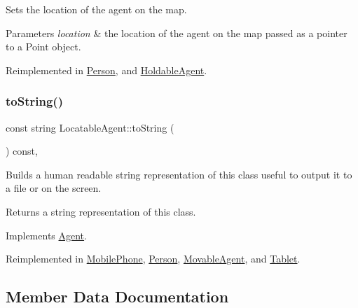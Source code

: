 Sets the location of the agent on the map. 
\begin{DoxyParams}{Parameters}
{\em location} & the location of the agent on the map passed as a pointer to a Point object. \\
\hline
\end{DoxyParams}


Reimplemented in \hyperlink{class_person_a05f4ac2107d59e03f0f336eda08aa358}{Person}, and \hyperlink{class_holdable_agent_aec98d2fe325b48d9a84ad3dad44700e0}{Holdable\+Agent}.

\mbox{\label{class_locatable_agent_a88674f4c8ab9b1b2f3986b226bf4244f}} 
\subsubsection{\texorpdfstring{to\+String()}{toString()}}
{\footnotesize\ttfamily const string Locatable\+Agent\+::to\+String (\begin{DoxyParamCaption}{ }\end{DoxyParamCaption}) const\hspace{0.3cm}{\ttfamily [override]}, {\ttfamily [virtual]}}

Builds a human readable string representation of this class useful to output it to a file or on the screen. \begin{DoxyReturn}{Returns}
a string representation of this class. 
\end{DoxyReturn}


Implements \hyperlink{class_agent_a44f291596d10c7878b0641d6ec156328}{Agent}.



Reimplemented in \hyperlink{class_mobile_phone_a2b7e556d12a43e380786ad0eccf3ce04}{Mobile\+Phone}, \hyperlink{class_person_a68872538da519d0a04297f43376db27c}{Person}, \hyperlink{class_movable_agent_a1dee2a6bf93f01006fadfb6fba6c9a59}{Movable\+Agent}, and \hyperlink{class_tablet_a3fae01e7d526699476221c6a686a4fba}{Tablet}.



\subsection{Member Data Documentation}
\mbox{\label{class_locatable_agent_a2a76ba315733ab26f19229a71071704d}} 
